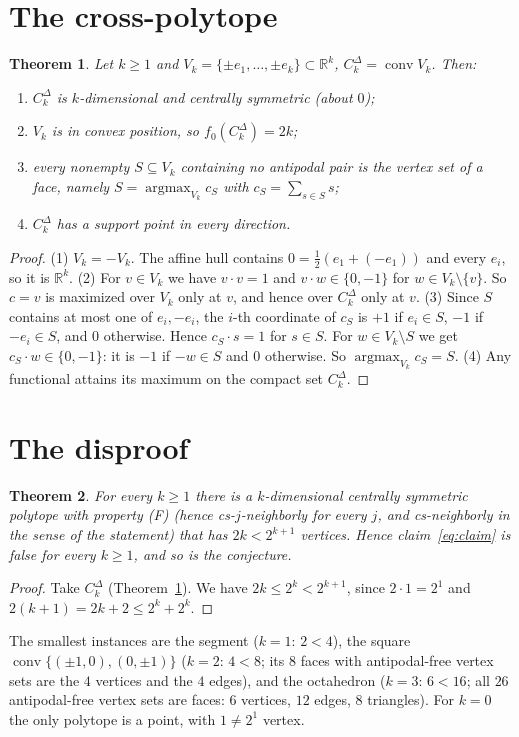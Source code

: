 \documentclass[11pt]{article}
\newtheorem{theorem}{Theorem}
\theoremstyle{definition}
\theoremstyle{remark}
\begin{document}
\section{The cross-polytope}
\begin{theorem}\label{thm:cross}
Let $k\ge1$ and $V_k=\{\pm e_1,\dots,\pm e_k\}\subset\mathbb R^k$, $C^\Delta_k=\operatorname{conv}V_k$.
Then:
\begin{enumerate}
\item $C^\Delta_k$ is $k$-dimensional and centrally symmetric (about $0$);
\item $V_k$ is in convex position, so $f_0(C^\Delta_k)=2k$;
\item every nonempty $S\subseteq V_k$ containing no antipodal pair is the vertex
set of a face, namely $S=\operatorname{argmax}_{V_k}c_S$ with $c_S=\sum_{s\in S}s$;
\item $C^\Delta_k$ has a support point in every direction.
\end{enumerate}
\end{theorem}
\begin{proof}
(1) $V_k=-V_k$. The affine hull contains $0=\tfrac12(e_1+(-e_1))$ and every $e_i$,
so it is $\mathbb R^k$.
(2) For $v\in V_k$ we have $v\cdot v=1$ and $v\cdot w\in\{0,-1\}$ for $w\in V_k\setminus\{v\}$.
So $c=v$ is maximized over $V_k$ only at $v$, and hence over $C^\Delta_k$ only at $v$.
(3) Since $S$ contains at most one of $e_i,-e_i$, the $i$-th coordinate of $c_S$
is $+1$ if $e_i\in S$, $-1$ if $-e_i\in S$, and $0$ otherwise. Hence
$c_S\cdot s=1$ for $s\in S$. For $w\in V_k\setminus S$ we get $c_S\cdot w\in\{0,-1\}$:
it is $-1$ if $-w\in S$ and $0$ otherwise. So $\operatorname{argmax}_{V_k}c_S=S$.
(4) Any functional attains its maximum on the compact set $C^\Delta_k$.
\end{proof}

\section{The disproof}
\begin{theorem}\label{thm:main}
For every $k\ge1$ there is a $k$-dimensional centrally symmetric polytope with
property (F) (hence cs-$j$-neighborly for every $j$, and cs-neighborly in the sense
of the statement) that has $2k<2^{k+1}$ vertices. Hence claim~\eqref{eq:claim} is false
for every $k\ge1$, and so is the conjecture.
\end{theorem}
\begin{proof}
Take $C^\Delta_k$ (Theorem~\ref{thm:cross}). We have $2k\le 2^k<2^{k+1}$, since
$2\cdot1=2^1$ and $2(k+1)=2k+2\le 2^k+2^k$.
\end{proof}
The smallest instances are the segment ($k=1$: $2<4$), the square
$\operatorname{conv}\{(\pm1,0),(0,\pm1)\}$ ($k=2$: $4<8$; its $8$ faces with
antipodal-free vertex sets are the $4$ vertices and the $4$ edges), and the octahedron ($k=3$:
$6<16$; all $26$ antipodal-free vertex sets are faces: $6$ vertices, $12$ edges, $8$ triangles).
For $k=0$ the only polytope is a point, with $1\ne2^1$ vertex.
\end{document}
